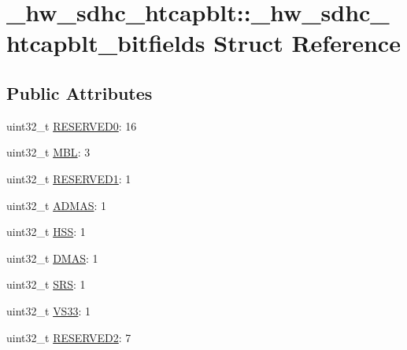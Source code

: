 \hypertarget{struct__hw__sdhc__htcapblt_1_1__hw__sdhc__htcapblt__bitfields}{}\section{\+\_\+hw\+\_\+sdhc\+\_\+htcapblt\+:\+:\+\_\+hw\+\_\+sdhc\+\_\+htcapblt\+\_\+bitfields Struct Reference}
\label{struct__hw__sdhc__htcapblt_1_1__hw__sdhc__htcapblt__bitfields}
\subsection*{Public Attributes}
\begin{DoxyCompactItemize}
\item 
uint32\+\_\+t \hyperlink{struct__hw__sdhc__htcapblt_1_1__hw__sdhc__htcapblt__bitfields_a6843563af88f74d2bdebdec32c95c6b3}{R\+E\+S\+E\+R\+V\+E\+D0}\+: 16
\item 
uint32\+\_\+t \hyperlink{struct__hw__sdhc__htcapblt_1_1__hw__sdhc__htcapblt__bitfields_ab3bc194333a42df36c2d91fc7b08b9ea}{M\+BL}\+: 3
\item 
uint32\+\_\+t \hyperlink{struct__hw__sdhc__htcapblt_1_1__hw__sdhc__htcapblt__bitfields_ad6c8f1967b326297b8ad89de631af4d9}{R\+E\+S\+E\+R\+V\+E\+D1}\+: 1
\item 
uint32\+\_\+t \hyperlink{struct__hw__sdhc__htcapblt_1_1__hw__sdhc__htcapblt__bitfields_a77f4d33c5cf3dcd1f1d7a49d151fd2be}{A\+D\+M\+AS}\+: 1
\item 
uint32\+\_\+t \hyperlink{struct__hw__sdhc__htcapblt_1_1__hw__sdhc__htcapblt__bitfields_a0906ca4363dbb997be4f6d7e38673e62}{H\+SS}\+: 1
\item 
uint32\+\_\+t \hyperlink{struct__hw__sdhc__htcapblt_1_1__hw__sdhc__htcapblt__bitfields_a53c3e85c32f930c0a2098ef226c5a781}{D\+M\+AS}\+: 1
\item 
uint32\+\_\+t \hyperlink{struct__hw__sdhc__htcapblt_1_1__hw__sdhc__htcapblt__bitfields_abb7789a7bdcf55a7a4e56d7eeb0a8211}{S\+RS}\+: 1
\item 
uint32\+\_\+t \hyperlink{struct__hw__sdhc__htcapblt_1_1__hw__sdhc__htcapblt__bitfields_adce28b1e57addab9a3c9419c7eb43edb}{V\+S33}\+: 1
\item 
uint32\+\_\+t \hyperlink{struct__hw__sdhc__htcapblt_1_1__hw__sdhc__htcapblt__bitfields_a2acfb19a8fb1c88b09406c1b91f24d1a}{R\+E\+S\+E\+R\+V\+E\+D2}\+: 7
\end{DoxyCompactItemize}



